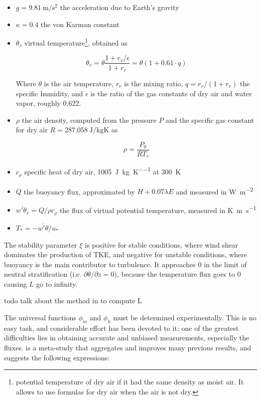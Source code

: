 \documentclass[12pt]{book}
\begin{document}
\begin{itemize}
\item $g=\SI{9.81}{\meter\per\square\second}$ the acceleration due to Earth's gravity
\item $\kappa=0.4$ the von Karman constant

\item $\theta_v$ virtual temperature\footnote{potential temperature of dry air if it had the same density as moist air. It allows to use formulas for dry air when the air is not dry.}, obtained as

\begin{equation}
\label{eq:vtemp}
\theta_v=\theta\frac{1+r_v/\epsilon}{1+r_v}=\theta(1+0.61\cdot q)
\end{equation}

Where $\theta$ is the air temperature, $r_v$ is the mixing ratio, $q=r_v/(1+r_v)$ the specific humidity, and $\epsilon$ is the ratio of the gas constants of dry air and water vapor, roughly 0.622.

\item $\rho$ the air density, computed from the pressure $P$ and the specific gas constant for dry air $R=\SI{287.058}{\joule\per\kilo\gram\kelvin}$ as

$$
\rho=\frac{P_0}{RT_v}
$$


\item $c_\rho$ specific heat of dry air, \SI{1005}{\joule\per\kilo\gram\per\kelvin} at \SI{300}{\kelvin}
\item $Q$ the buoyancy flux, approximated by $H+0.07\lambda E$ and measured in \si{\watt\per\square\meter}
\item $\overline{w'\theta_v}=Q/\rho c_\rho$ the flux of virtual potential temperature, measured in \si{\kelvin\meter\per\second}
\item $T_*=-\overline{w'\theta}/u_*$
\end{itemize}

The stability parameter $\xi$ is positive for stable conditions, where wind shear dominates the production of TKE, and negative for unstable conditions, where buoyancy is the main contributor to turbulence. It approaches 0 in the limit of neutral stratification (i.e. $\partial\overline{\theta}/\partial z=0$), because the temperature flux goes to 0 causing $L$ go to infinity.

todo talk about the method in \citep{cabauw_abl} to compute L

The universal functions $\phi_m$ and $\phi_h$ must be determined experimentally. This is no easy task, and considerable effort has been devoted to it; one of the greatest difficulties lies in obtaining accurate and unbiased measurements, especially the fluxes. \cite{hogstrom88} is a meta-study that aggregates and improves many previous results, and suggests the following expressions:
\end{document}
